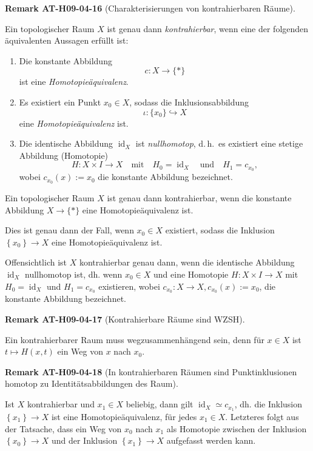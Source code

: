 \documentclass[10pt, letterpaper]{article}
\newcommand{\CustomHeading}[3]{%
  \par\medskip\noindent%
  \textbf{#1 #2} \textnormal{(#3)}.\enskip%
}
\newenvironment{REM}[2]{\begin{unitbox}\CustomHeading{Remark}{#1}{#2}}{\end{unitbox}}
\begin{document}
\begin{REM}{AT-H09-04-16}{Charakterisierungen von kontrahierbaren Räume}
Ein topologischer Raum \( X \) ist genau dann \emph{kontrahierbar}, wenn eine der folgenden äquivalenten Aussagen erfüllt ist:

\begin{enumerate}[label=(\arabic*)]
\item Die konstante Abbildung
\[
c: X \rightarrow \{*\}
\]
ist eine \emph{Homotopieäquivalenz}.

\item Es existiert ein Punkt \( x_0 \in X \), sodass die Inklusionsabbildung
\[
\iota: \{x_0\} \hookrightarrow X
\]
eine \emph{Homotopieäquivalenz} ist.

\item Die identische Abbildung \( \operatorname{id}_X \) ist \emph{nullhomotop}, d.\,h.\ es existiert eine stetige Abbildung (Homotopie)
\[
H: X \times I \rightarrow X \quad \text{mit} \quad H_0 = \operatorname{id}_X \quad \text{und} \quad H_1 = c_{x_0},
\]
wobei \( c_{x_0}(x) := x_0 \) die konstante Abbildung bezeichnet.
\end{enumerate}
\end{REM}


Ein topologischer Raum $X$ ist genau dann kontrahierbar, wenn die konstante Abbildung $X \rightarrow\{*\}$ eine Homotopieäquivalenz ist. 

Dies ist genau dann der Fall, wenn $x_{0} \in X$ existiert, sodass die Inklusion $\left\{x_{0}\right\} \rightarrow X$ eine Homotopieäquivalenz ist. 

Offensichtlich ist $X$ kontrahierbar genau dann, wenn die identische Abbildung $\operatorname{id}_{X}$ nullhomotop ist, dh. wenn $x_{0} \in X$ und eine Homotopie $H: X \times I \rightarrow X$ mit $H_{0}=\operatorname{id}_{X}$ und $H_{1}=c_{x_{0}}$ existieren, wobei $c_{x_{0}}: X \rightarrow X, c_{x_{0}}(x):=x_{0}$, die konstante Abbildung bezeichnet. 


\begin{REM}{AT-H09-04-17}{Kontrahierbare Räume sind WZSH}
Ein kontrahierbarer Raum muss wegzusammenhängend sein, denn für $x \in X$ ist $t \mapsto H(x, t)$ ein Weg von $x$ nach $x_{0}$.
\end{REM} 

\begin{REM}{AT-H09-04-18}{In kontrahierbaren Räumen sind Punktinklusionen homotop zu Identitätsabbildungen des Raum}
Ist $X$ kontrahierbar und $x_{1} \in X$ beliebig, dann gilt $\operatorname{id}_{X} \simeq c_{x_{1}}$, dh. die Inklusion $\left\{x_{1}\right\} \rightarrow X$ ist eine Homotopieäquivalenz, für jedes $x_{1} \in X$. Letzteres folgt aus der Tatsache, dass ein Weg von $x_{0}$ nach $x_{1}$ als Homotopie zwischen der Inklusion $\left\{x_{0}\right\} \rightarrow X$ und der Inklusion $\left\{x_{1}\right\} \rightarrow X$ aufgefasst werden kann.
\end{REM}
\end{document}
